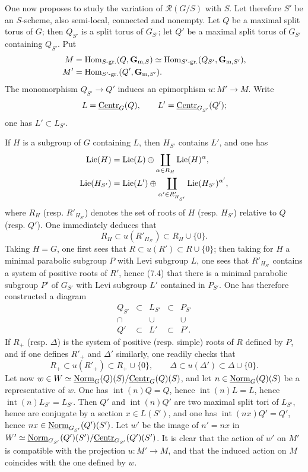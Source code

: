 \label{XXVI.7.12}
One now proposes to study the variation of $\mathscr R(G/S)$ with $S$. Let therefore $S'$ be an $S$-scheme, also semi-local, connected and nonempty. Let $Q$ be a maximal split torus of $G$; then $Q_{S'}$ is a split torus of $G_{S'}$; let $Q'$ be a maximal split torus of $G_{S'}$ containing $Q_{S'}$. Put
\[
\begin{aligned}
 M&=\operatorname{Hom}_{S\text{-gr.}}(Q,\mathbf G_{\mathrm m,S})
 \simeq\operatorname{Hom}_{S'\text{-gr.}}(Q_{S'},\mathbf G_{\mathrm m,S'}),\\
 M'&=\operatorname{Hom}_{S'\text{-gr.}}(Q',\mathbf G_{\mathrm m,S'}).
\end{aligned}
\]
The monomorphism $Q_{S'}\to Q'$ induces an epimorphism $u:M'\to M$. Write
\[
 L=\underline{\mathrm{Centr}}_G(Q),\qquad L'=\underline{\mathrm{Centr}}_{G_{S'}}(Q');
\]
one has $L'\subset L_{S'}$.

If $H$ is a subgroup of $G$ containing $L$, then $H_{S'}$ contains $L'$, and one has
\[
\begin{aligned}
 \operatorname{Lie}(H)&=\operatorname{Lie}(L)\oplus\coprod_{\alpha\in R_H}\operatorname{Lie}(H)^\alpha,\\
 \operatorname{Lie}(H_{S'})&=\operatorname{Lie}(L')\oplus\coprod_{\alpha'\in R'_{H_{S'}}}\operatorname{Lie}(H_{S'})^{\alpha'},
\end{aligned}
\]
where $R_H$ (resp. $R'_{H_{S'}}$) denotes the set of roots of $H$ (resp. $H_{S'}$) relative to $Q$ (resp. $Q'$). One immediately deduces that
\[
 R_H\subset u(R'_{H_{S'}})\subset R_H\cup\{0\}.
\]
Taking $H=G$, one first sees that $R\subset u(R')\subset R\cup\{0\}$; then taking for $H$ a minimal parabolic subgroup $P$ with Levi subgroup $L$, one sees that $R'_{H_{S'}}$ contains a system of positive roots of $R'$, hence (7.4) that there is a minimal parabolic subgroup $P'$ of $G_{S'}$ with Levi subgroup $L'$ contained in $P_{S'}$. One has therefore constructed a diagram
\[
\begin{array}{ccccc}
 Q_{S'}&\subset&L_{S'}&\subset&P_{S'}\\
 \cap&&\cup&&\cup\\
 Q'&\subset&L'&\subset&P'.
\end{array}
\]
If $R_+$ (resp. $\Delta$) is the system of positive (resp. simple) roots of $R$ defined by $P$, and if one defines $R'_+$ and $\Delta'$ similarly, one readily checks that
\[
 R_+\subset u(R'_+)\subset R_+\cup\{0\},\qquad
 \Delta\subset u(\Delta')\subset\Delta\cup\{0\}.
\]
Let now $w\in W\simeq\underline{\mathrm{Norm}}_G(Q)(S)/\underline{\mathrm{Centr}}_G(Q)(S)$, and let $n\in\underline{\mathrm{Norm}}_G(Q)(S)$ be a representative of $w$. One has $\operatorname{int}(n)Q=Q$, hence $\operatorname{int}(n)L=L$, hence $\operatorname{int}(n)L_{S'}=L_{S'}$. Then $Q'$ and $\operatorname{int}(n)Q'$ are two maximal split tori of $L_{S'}$, hence are conjugate by a section $x\in L(S')$, and one has $\operatorname{int}(nx)Q'=Q'$, hence $nx\in\underline{\mathrm{Norm}}_{G_{S'}}(Q')(S')$. Let $w'$ be the image of $n'=nx$ in $W'\simeq\underline{\mathrm{Norm}}_{G_{S'}}(Q')(S')/\underline{\mathrm{Centr}}_{G_{S'}}(Q')(S')$. It is clear that the action of $w'$ on $M'$ is compatible with the projection $u:M'\to M$, and that the induced action on $M$ coincides with the one defined by $w$.


